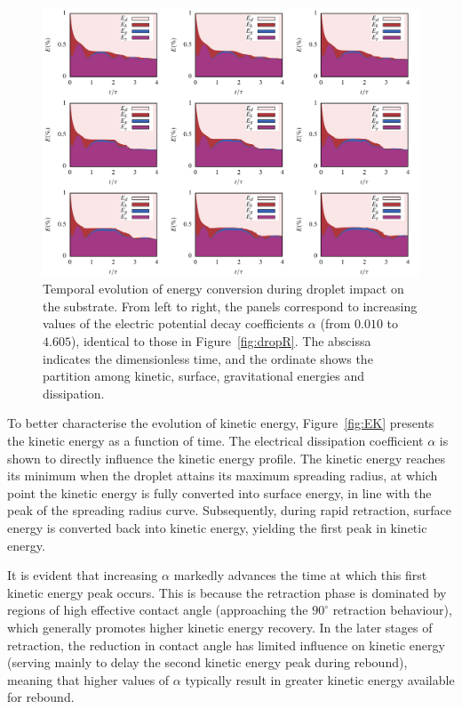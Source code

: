 \documentclass[lineno]{cls/jfm}
\begin{document}
 \begin{figure}
  \centerline{\includegraphics[width=1.0\textwidth]{fig/dropETC.pdf}}
  \caption{Temporal evolution of energy conversion during droplet impact on the substrate. From left to right, the panels correspond to increasing values of the electric potential decay coefficients $\alpha$ (from $0.010$ to $4.605$), identical to those in Figure~\ref{fig:dropR}. The abscissa indicates the dimensionless time, and the ordinate shows the partition among kinetic, surface, gravitational energies and dissipation.}
 \label{fig:ETC}
 \end{figure}

To better characterise the evolution of kinetic energy, Figure~\ref{fig:EK} presents the kinetic energy as a function of time. The electrical dissipation coefficient $\alpha$ is shown to directly influence the kinetic energy profile. The kinetic energy reaches its minimum when the droplet attains its maximum spreading radius, at which point the kinetic energy is fully converted into surface energy, in line with the peak of the spreading radius curve. Subsequently, during rapid retraction, surface energy is converted back into kinetic energy, yielding the first peak in kinetic energy.

It is evident that increasing $\alpha$ markedly advances the time at which this first kinetic energy peak occurs. This is because the retraction phase is dominated by regions of high effective contact angle (approaching the $90^\circ$ retraction behaviour), which generally promotes higher kinetic energy recovery. In the later stages of retraction, the reduction in contact angle has limited influence on kinetic energy (serving mainly to delay the second kinetic energy peak during rebound), meaning that higher values of $\alpha$ typically result in greater kinetic energy available for rebound.
\end{document}

